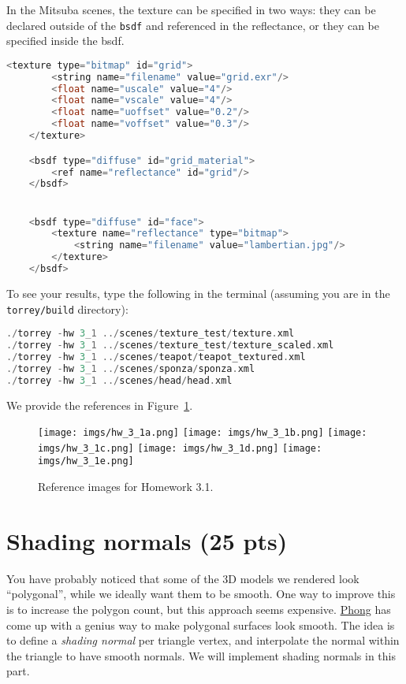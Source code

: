 In the Mitsuba scenes, the texture can be specified in two ways: they can be declared outside of the \lstinline{bsdf} and referenced in the reflectance, or they can be specified inside the bsdf.
\begin{lstlisting}[language=C++]
	<texture type="bitmap" id="grid">
		<string name="filename" value="grid.exr"/>
		<float name="uscale" value="4"/>
		<float name="vscale" value="4"/>
		<float name="uoffset" value="0.2"/>
		<float name="voffset" value="0.3"/>
	</texture>

	<bsdf type="diffuse" id="grid_material">
		<ref name="reflectance" id="grid"/>
	</bsdf>


	<bsdf type="diffuse" id="face">
		<texture name="reflectance" type="bitmap">
			<string name="filename" value="lambertian.jpg"/>
		</texture>
	</bsdf>
\end{lstlisting}

To see your results, type the following in the terminal (assuming you are in the \lstinline{torrey/build} directory):
\begin{lstlisting}[language=C++]
./torrey -hw 3_1 ../scenes/texture_test/texture.xml
./torrey -hw 3_1 ../scenes/texture_test/texture_scaled.xml
./torrey -hw 3_1 ../scenes/teapot/teapot_textured.xml
./torrey -hw 3_1 ../scenes/sponza/sponza.xml
./torrey -hw 3_1 ../scenes/head/head.xml
\end{lstlisting}
We provide the references in Figure~\ref{fig:hw_3_1}.

\begin{figure}[ht]
    \centering
    \texttt{[image: imgs/hw\_3\_1a.png]}
    \texttt{[image: imgs/hw\_3\_1b.png]}
    \texttt{[image: imgs/hw\_3\_1c.png]}
    \texttt{[image: imgs/hw\_3\_1d.png]}
    \texttt{[image: imgs/hw\_3\_1e.png]}
    \caption{Reference images for Homework 3.1.}
    \label{fig:hw_3_1}
\end{figure}

\section{Shading normals (25 pts)}
You have probably noticed that some of the 3D models we rendered look ``polygonal'', while we ideally want them to be smooth. One way to improve this is to increase the polygon count, but this approach seems expensive. \href{https://en.wikipedia.org/wiki/Phong_shading}{Phong} has come up with a genius way to make polygonal surfaces look smooth. The idea is to define a \emph{shading normal} per triangle vertex, and interpolate the normal within the triangle to have smooth normals. We will implement shading normals in this part.

